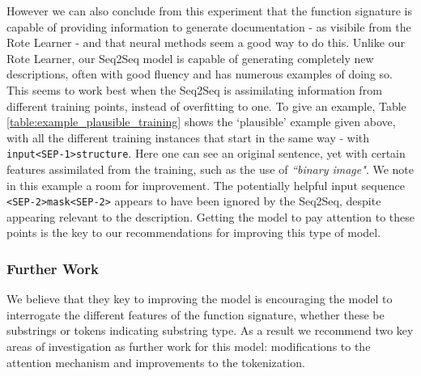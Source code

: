 However we can also conclude from this experiment that the function signature is capable of providing information to generate documentation - as visibile from the Rote Learner - and that neural methods seem a good way to do this.
Unlike our Rote Learner, our Seq2Seq model is capable of generating completely new descriptions, often with good fluency and has numerous examples of doing so. This seems to work best when the Seq2Seq is assimilating information from different training points, instead of overfitting to one. 
To give an example, Table \ref{table:example_plausible_training} shows the `plausible' example given above, with all the different training instances that start in the same way - with \texttt{input<SEP-1>structure}. 
Here one can see an original sentence, yet with certain features assimilated from the training, such as the use of \textit{``binary image"}. We note in this example a room for improvement. The potentially helpful input sequence \texttt{<SEP-2>mask<SEP-2>} appears to have been ignored by the Seq2Seq, despite appearing relevant to the description. 
Getting the model to pay attention to these points is the key to our recommendations for improving this type of model.

\subsubsection{Further Work}

We believe that they key to improving the model is encouraging the model to interrogate the different features of the function signature, whether these be substrings or tokens indicating substring type.
As a result we recommend two key areas of investigation as further work for this model: modifications to the attention mechanism and improvements to the tokenization. 


